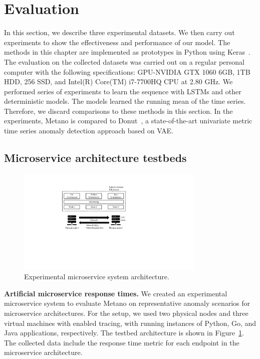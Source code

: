 \section{Evaluation}\label{metrics:evaluation}
In this section, we describe three experimental datasets. We then carry out experiments to show the effectiveness and performance of our model. The methods in this chapter are implemented as prototypes in Python using Keras~\cite{chollet2015keras}. The evaluation on the collected datasets was carried out on a regular personal computer with the following specifications: GPU-NVIDIA GTX 1060 6GB, 1TB HDD, 256 SSD, and Intel(R) Core(TM) i7-7700HQ CPU at 2.80 GHz. 
We performed series of experiments to learn the sequence with LSTMs and other deterministic models. The models learned the running mean of the time series. Therefore, we discard comparisons to these methods in this section. In the experiments, Metano is compared to Donut~\cite{donut}, a state-of-the-art univariate metric time series anomaly detection approach based on VAE. 

\subsection{Microservice architecture testbeds}
\begin{figure}[!t]
\centerline{\includegraphics[width=0.8\textwidth]{gfx/chap4/artificialmicroservicetestbed.pdf}}
\caption{Experimental microservice system architecture.}
\label{testbed}
\end{figure}
\textbf{Artificial microservice response times.}
We created an experimental microservice system to evaluate Metano on  representative anomaly scenarios for microservice architectures. For the setup, we used two physical nodes and three virtual machines with enabled tracing, with running instances of Python, Go, and Java applications, respectively. The testbed architecture is shown in Figure~\ref{testbed}. The collected data include the response time metric for each endpoint in the microservice architecture.


